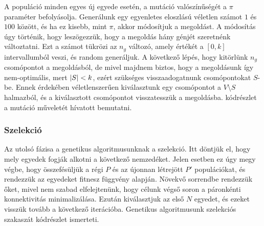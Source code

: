 A populáció minden egyes új egyede esetén, a mutáció valószínűségét a $\pi$ paraméter befolyásolja.
Generálunk egy egyenletes eloszlású véletlen számot $1$ és $100$ között, és ha ez kisebb, mint $\pi$, akkor módosítjuk a megoldást.
A módosítás úgy történik, hogy leszögezzük, hogy a megoldás hány génjét szeretnénk változtatni.
Ezt a számot tükrözi az $n_{g}$ változó, amely értékét a $\left[0, k\right]$ intervallumból veszi, és random generáljuk.
A következő lépés, hogy kitörlünk $n_{g}$ csomópontot a megoldásból, de mivel majdnem biztos,
hogy a megoldásunk így nem-optimális, mert $\lvert S\rvert < k$, ezért szükséges visszaadogatnunk csomópontokat $S$-be.
Ennek érdekében véletlenszerűen kiválasztunk egy csomópontot a $V \setminus S$ halmazból,
és a kiválasztott csomópontot visszatesszük a megoldásba.
 kódrészlet a mutáció műveletét hívatott bemutatni.



\subsubsection{Szelekció}
Az utolsó fázisa a genetikus algoritmusunknak a szelekció.
Itt döntjük el, hogy mely egyedek fogják alkotni a következő nemzedéket.
Jelen esetben ez úgy megy végbe, hogy összefésüljük a régi $P$ és az újonnan létrejött $P'$ populációkat,
és rendezzük az egyedeket  fitnesz függvény alapján.
Növekvő sorrendbe rendezzük őket, mivel nem szabad elfelejtenünk, hogy célunk végső soron a páronkénti konnektivitás minimalizálása.
Ezután kiválasztjuk az első $N$ egyedet, és ezeket visszük tovább a következő iterációba.
Genetikus algoritmusunk szelekciós szakaszát  kódrészlet ismerteti.

